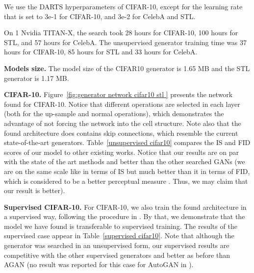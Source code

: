 \documentclass[10pt,twocolumn,letterpaper]{article}
\begin{document}
We use the DARTS \cite{liu19darts} hyperparameters of CIFAR-10, except for the learning rate that is set to 3e-1 for CIFAR-10, and 3e-2 for CelebA and STL.

On 1 Nvidia TITAN-X, the search took 28 hours for CIFAR-10, 100 hours for STL, and 57 hours for CelebA.
The unsupervised generator training time was 37 hours for CIFAR-10, 85 hours for STL and 33 hours for CelebA. 

{\bf Models size.}
The model size of the CIFAR10 generator is 1.65 MB and the STL generator is 1.17 MB.

{\bf CIFAR-10.} Figure~\ref{fig:generator network cifar10 stl } presents the network found for CIFAR-10. Notice that different operations are selected in each layer (both for the up-sample and normal operations), which demonstrates the advantage of not forcing the network into the cell structure. 
Note also that the found architecture does contains skip connections, which resemble the current state-of-the-art generators.
Table~\ref{unsupervised cifar10} compares the IS and FID scores of our model to other existing works. Notice that our results are on par with the state of the art methods and better than the other searched GANs (we are on the same scale like \cite{agan} in terms of IS but much better than it in terms of FID, which is considered to be a better perceptual measure \cite{fid}. Thus, we may claim that our result is better).


{\bf Supervised CIFAR-10.} For CIFAR-10, we also train the found architecture in a supervised way, following the procedure in \cite{ctagn}.
By that, we demonstrate that the model we have found is transferable to supervised training.
The results of the supervised case appear in Table~\ref{supervised cifar10}.
Note that although the generator was searched in an unsupervised form, our supervised results are competitive with the other supervised generators and better as before than AGAN \cite{agan} (no result was reported for this case for AutoGAN in \cite{Autogan}).
\end{document}
